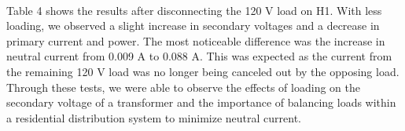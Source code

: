 \paragraph{}Table 4 shows the results after disconnecting the 120 V load on H1. With less loading, we observed a slight increase in secondary voltages and a decrease in primary current and power. The most noticeable difference was the increase in neutral current from 0.009 A to 0.088 A. This was expected as the current from the remaining 120 V load was no longer being canceled out by the opposing load.
Through these tests, we were able to observe the effects of loading on the secondary voltage of a transformer and the importance of balancing loads within a residential distribution system to minimize neutral current.

\clearpage
